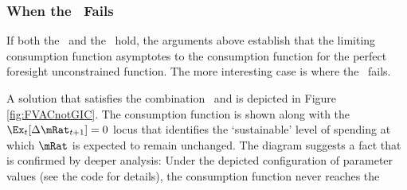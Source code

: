 \documentclass[BufferStockTheory]{subfiles}
\begin{document}
\hypertarget{The-GIC}{}
\hypertarget{When-the-GIC-Fails}{}
\subsubsection{When the \GIC~Fails}

If both the \GIC~and the \RIC~hold, the arguments above establish that the limiting consumption
function asymptotes to the consumption function for the perfect foresight unconstrained function.
The more interesting case is where the \GIC~fails.

A solution that satisfies the combination \FVAC~and
\cncl{\GIC} is depicted in Figure \ref{fig:FVACnotGIC}.  The
consumption function is shown along with the $\Ex_{t}[\Delta
\mRat_{t+1}]=0$ locus that identifies the `sustainable' level of
spending at which $\mRat$ is expected to remain unchanged.  The
diagram suggests a fact that is confirmed by deeper analysis: Under
the depicted configuration of parameter values (see the code for details), the consumption function never reaches the
\end{document}
